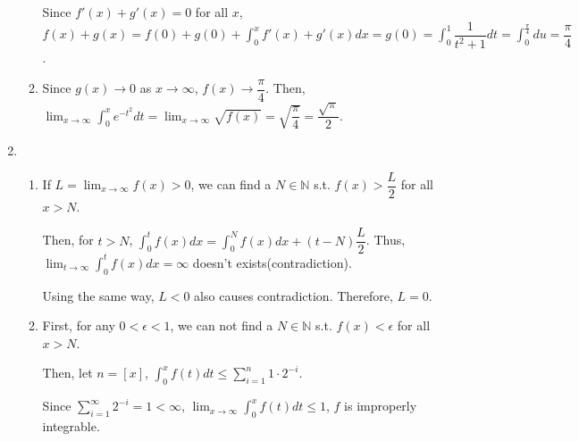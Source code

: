 \documentclass[12pt]{article}
\begin{document}
\begin{enumerate}
\begin{enumerate}
        Since $f'(x) + g'(x) = 0$ for all $x$, $f(x) + g(x) = f(0) + g(0) + \displaystyle\int_0^x f'(x) + g'(x) dx = g(0) = \displaystyle\int_0^1 \dfrac{1}{t^2 + 1} dt =\displaystyle\int_0^\frac{\pi}{4} du = \dfrac{\pi}{4}$.

        \item Since $g(x) \to 0$ as $x \to \infty$, $f(x) \to \dfrac{\pi}{4}$.
        Then, $\displaystyle\lim_{x\to\infty} \displaystyle\int_0^x e^{-t^2} dt = \displaystyle\lim_{x\to\infty} \sqrt{f(x)} = \sqrt{\dfrac{\pi}{4}} = \dfrac{\sqrt{\pi}}{2}$.
    \end{enumerate}

    \item \begin{enumerate}
        \item If $L = \displaystyle\lim_{x \to \infty} f(x) > 0$, we can find a $N\in\mathbb{N}$ s.t. $f(x) > \dfrac{L}{2}$ for all $x > N$.
        
        Then, for $t > N$, $\displaystyle\int_0^t f(x) dx = \displaystyle\int_0^N f(x) dx + (t-N)\dfrac{L}{2}$.
        Thus, $\displaystyle\lim_{t\to\infty} \displaystyle\int_0^t f(x) dx = \infty$ doesn't exists(contradiction).

        Using the same way, $L < 0$ also causes contradiction.
        Therefore, $L = 0$.

        \item First, for any $0<\epsilon < 1$, we can not find a $N \in \mathbb{N}$ s.t. $f(x) < \epsilon$ for all $x > N$.
        
        Then, let $n = [x]$, $\displaystyle\int_0^x f(t) dt \leq \displaystyle\sum_{i=1}^{n} 1 \cdot 2^{-i}$.

        Since $\displaystyle\sum_{i=1}^{\infty} 2^{-i} = 1 < \infty$, $\displaystyle\lim_{x \to \infty}\displaystyle\int_0^x f(t) dt \leq 1$, $f$ is improperly integrable.
    \end{enumerate}
\end{enumerate}
\end{document}
